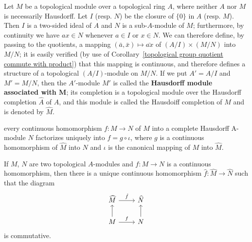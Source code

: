 Let $M$ be a topological module over a topological ring $A$, where neither $A$ nor $M$ is necessarily Hausdorff. Let $I$ (resp. $N$) be the closure of $\{0\}$ in $A$ (resp. $M$). Then $I$ is a two-sided ideal of $A$ and $N$ is a sub-$A$-module of $M$; furthermore, by continuity we have $ax\in N$ whenever $a\in I$ or $x\in N$. We can therefore define, by passing to the quotients, a mapping $(\bar{a},\bar{x})\mapsto\bar{ax}$ of $(A/I)\times(M/N)$ into $M/N$; it is easily verified (by use of Corollary~\ref{topological group quotient commute with product}) that this mapping is continuous, and therefore defines a structure of a topological $(A/I)$-module on $M/N$. If we put $A'=A/I$ and $M'=M/N$, then the $A'$-module $M'$ is called the \textbf{Hausdorff module associated with $\bm{M}$}; its completion is a topological module over the Hausdorff completion $\widehat{A}$ of $A$, and this module is called the Hausdoiff completion of $M$ and is denoted by $\widehat{M}$.
\begin{proposition}
every continuous homomorphism $f:M\to N$ of $M$ into a complete Hausdorff A-module $N$ factorizes uniquely into $f=g\circ\iota$, where $g$ is a continuous homomorphism of $\widehat{M}$ into $N$ and $\iota$ is the canonical mapping of $M$ into $\widehat{M}$.
\end{proposition}
\begin{proposition}
If $M$, $N$ are two topological $A$-modules and $f:M\to N$ is a continuous homomorphism, then there is a unique continuous homomorphism $\hat{f}:\widehat{M}\to\widehat{N}$ such that the diagram
\[\begin{tikzcd}
\widehat{M}\ar[r,"\hat{f}"]&\widehat{N}\\
M\ar[u]\ar[r,"f"]&N\ar[u]
\end{tikzcd}\]
is commutative.
\end{proposition}
